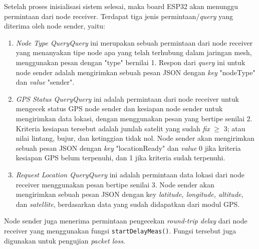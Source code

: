 Setelah proses inisialisasi sistem selesai, maka board ESP32 akan menunggu permintaan dari node receiver. Terdapat tiga jenis permintaan/\textit{query} yang diterima oleh node sender, yaitu:
\begin{enumerate}
	\item \textit{Node Type Query}\newline \textit{Query} ini merupakan sebuah permintaan dari node receiver yang menanyakan tipe node apa yang telah terhubung dalam jaringan mesh, menggunakan pesan dengan "type" bernilai 1. Respon dari \textit{query} ini untuk node sender adalah mengirimkan sebuah pesan JSON dengan \textit{key} "nodeType" dan \textit{value} "sender".
	\item \textit{GPS Status Query}\newline \textit{Query} ini adalah permintaan dari node receiver untuk mengecek status GPS node sender dan kesiapan node sender untuk mengirimkan data lokasi, dengan menggunakan pesan yang bertipe senilai 2. Kriteria kesiapan tersebut adalah jumlah satelit yang sudah \textit{fix} $\geq$ 3; atau nilai lintang, bujur, dan ketinggian tidak nol. Node sender akan mengirimkan sebuah pesan JSON dengan \textit{key} "locationReady" dan \textit{value} 0 jika kriteria kesiapan GPS belum terpenuhi, dan 1 jika kriteria sudah terpenuhi.
	\item \textit{Request Location Query}\newline \textit{Query} ini adalah permintaan data lokasi dari node receiver menggunakan pesan bertipe senilai 3. Node sender akan mengirimkan sebuah pesan JSON dengan key \textit{latitude, longitude, altitude}, dan \textit{satellite}, berdasarkan data yang sudah didapatkan dari modul GPS.
\end{enumerate}
Node sender juga menerima permintaan pengecekan \textit{round-trip delay} dari node receiver yang menggunakan fungsi \verb|startDelayMeas()|. Fungsi tersebut juga digunakan untuk pengujian \textit{packet loss}.

